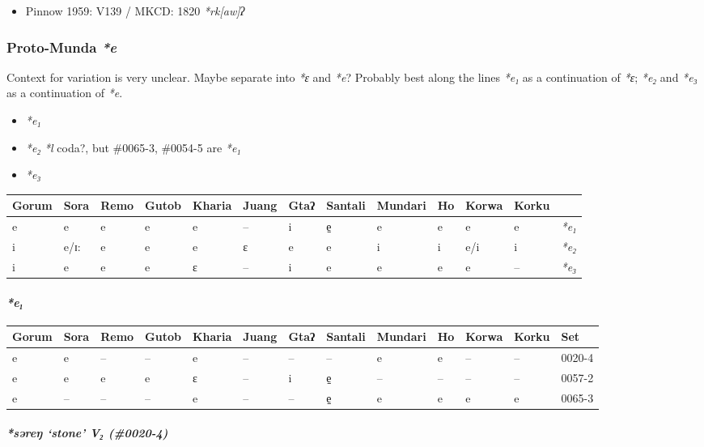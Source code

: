 \documentclass[a4paper,]{article}
\providecommand{\tightlist}{%
  \setlength{\itemsep}{0pt}\setlength{\parskip}{0pt}}
\let\oldparagraph\paragraph
\renewcommand{\paragraph}[1]{\oldparagraph{#1}\mbox{}}
\let\oldsubparagraph\subparagraph
\renewcommand{\subparagraph}[1]{\oldsubparagraph{#1}\mbox{}}
\begin{document}
\begin{itemize}
\tightlist
\item
  Pinnow 1959: V139 / MKCD: 1820 \emph{*rk{[}aw{]}ʔ}
\end{itemize}

\subsubsection{\texorpdfstring{Proto-Munda
\emph{*e}}{Proto-Munda *e}}\label{proto-munda-e}

Context for variation is very unclear. Maybe separate into \emph{*ɛ} and
\emph{*e}? Probably best along the lines \emph{*e₁} as a continuation of
\emph{*ɛ}; \emph{*e₂} and \emph{*e₃} as a continuation of \emph{*e}.

\begin{itemize}
\tightlist
\item
  \emph{*e₁}
\item
  \emph{*e₂} \emph{*l} coda?, but \#0065-3, \#0054-5 are \emph{*e₁}
\item
  \emph{*e₃}
\end{itemize}

\begin{longtable}[]{@{}lllllllllllll@{}}
\toprule
Gorum & Sora & Remo & Gutob & Kharia & Juang & Gtaʔ & Santali & Mundari
& Ho & Korwa & Korku &\tabularnewline
\midrule
\endhead
e & e & e & e & e & -- & i & e̠ & e & e & e & e &
\emph{*e₁}\tabularnewline
i & e/ɪ: & e & e & e & ɛ & e & e & i & i & e/i & i &
\emph{*e₂}\tabularnewline
i & e & e & e & ɛ & -- & i & e & e & e & e & -- &
\emph{*e₃}\tabularnewline
\bottomrule
\end{longtable}

\paragraph{\texorpdfstring{\emph{*e₁}}{*e₁}}\label{e}

\begin{longtable}[]{@{}lllllllllllll@{}}
\toprule
Gorum & Sora & Remo & Gutob & Kharia & Juang & Gtaʔ & Santali & Mundari
& Ho & Korwa & Korku & Set\tabularnewline
\midrule
\endhead
e & e & -- & -- & e & -- & -- & -- & e & e & -- & -- &
0020-4\tabularnewline
e & e & e & e & ɛ & -- & i & e̠ & -- & -- & -- & -- &
0057-2\tabularnewline
e & -- & -- & -- & e & -- & -- & e̠ & e & e & e & e &
0065-3\tabularnewline
\bottomrule
\end{longtable}

\subparagraph{\texorpdfstring{\emph{*səreŋ} `stone' V₂
(\#0020-4)}{*səreŋ stone V₂ (\#0020-4)}}\label{sux259reux14b-stone-v-0020-4}
\end{document}
